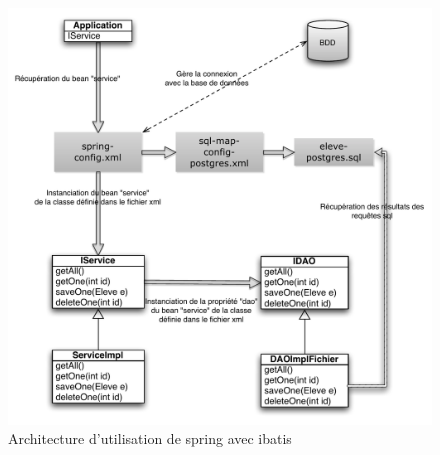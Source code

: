 \documentclass[a4paper,12pt]{article}
\begin{document}
\begin{figure}[H]
	\center
	\includegraphics[width=15cm]{img/springibatis.pdf}
	\caption{Architecture d'utilisation de spring avec ibatis}
\end{figure}

\newpage
\end{document}
